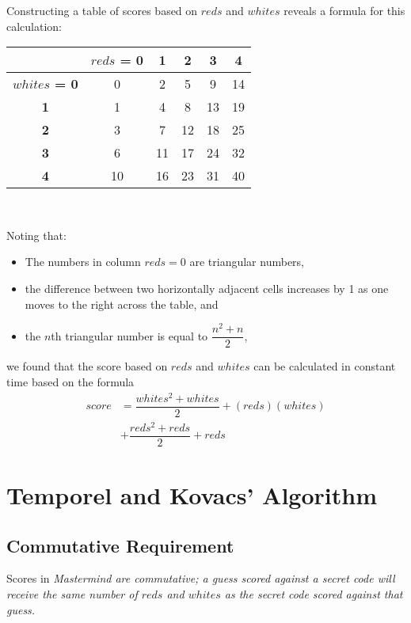 \documentclass[11pt,twocolumn]{article}
\begin{document}
Constructing a table of scores based on $reds$ and $whites$ reveals a formula for this calculation: \\

\begin{center}
\begin{tabular}{|c|c|c|c|c|c|}
\hline
\bf & \bf $reds$ = 0 & \bf 1 &\bf  2 &\bf  3 &\bf  4 \rm \\
\hline
\bf $whites$ = 0 \rm & 0 & 2 & 5 & 9 & 14\\
\hline
\bf 1 \rm & 1 & 4 & 8 & 13 & 19\\
\hline
\bf 2 \rm & 3 & 7 & 12 & 18 & 25\\
\hline
\bf 3 \rm & 6 & 11 & 17 & 24 & 32\\
\hline
\bf 4 \rm & 10 & 16 & 23 & 31 & 40\\
\hline
\end{tabular}\\
\end{center}

Noting that:

\begin{itemize}
\item The numbers in column $reds=0$ are triangular numbers, 
\item the difference between two horizontally adjacent cells increases by 1 as one moves to the right across the table, and
\item the $n$th triangular number is equal to $\dfrac{n^2 + n}{2}$,
\end{itemize}

we found that the score based on $reds$ and $whites$ can be calculated in constant time based on the formula 
\begin{align*}
score &= \dfrac{whites^2+whites}{2} + (reds)(whites)\\
&+ \dfrac{reds^2+reds}{2} + reds
\end{align*}

\section{Temporel and Kovacs' Algorithm}

\subsection{Commutative Requirement}

Scores in \em Mastermind \rm are \em commutative; \rm a guess scored against a secret code will receive the same number of $reds$ and $whites$ as the secret code scored against that guess. 
\end{document}
